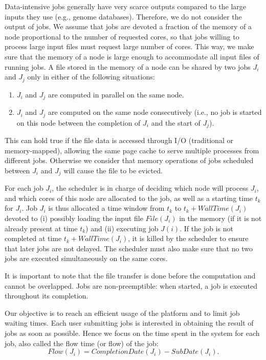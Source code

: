 \documentclass[conference]{IEEEtran}
\newcommand{\file}{\ensuremath{\mathit{File}}\xspace}
\newcommand{\memory}{\ensuremath{\mathit{M}}\xspace}
\newcommand{\submissiontime}{\mathit{SubDate}\xspace}
\newcommand{\walltime}{\mathit{WallTime}\xspace}
\newcommand{\completiontime}{\mathit{CompletionDate}\xspace}
\begin{document}
Data-intensive jobs generally have very scarce outputs compared to the large inputs they use (e.g., genome databases). 
Therefore, we do not consider the output of jobs.
We assume that jobs are
devoted a fraction of the memory of a node proportional to the number of
requested cores, so that jobs willing to process large input files
must request large number of cores. This way, we make sure that the
memory of a node is large enough to accommodate all input files of running jobs.
A file stored in the memory of a node can be shared by two jobs $J_i$
and $J_j$ only in either of the following situations:
\begin{enumerate}
	\item $J_i$ and $J_j$ are computed in parallel on the same node.
	\item $J_i$ and $J_j$ are computed on the same node
          consecutively (i.e., no job is started on this node between the
          completion of $J_i$ and the start of $J_j$).
\end{enumerate}
This can hold true if the file data is accessed through I/O (traditional or memory-mapped),
allowing the same page cache to serve multiple processes from different jobs.
Otherwise we consider that memory operations of jobs scheduled between
$J_i$ and $J_j$ will cause the file to be evicted.


For each job $J_i$, the scheduler is in charge of deciding which node
will process $J_i$, and which cores of this node
are allocated to the job, as well as a starting time $t_k$ for $J_i$. Job
$J_i$ is thus allocated a time window from $t_k$ to
$t_k+\walltime(J_i)$ devoted to (i) possibly loading the input file
$\file(J_i)$ in the memory (if it is not already present at time
$t_k$) and (ii) executing job $J(i)$. If the job is not completed at
time $t_k+\walltime(J_i)$, it is killed by the scheduler to ensure
that later jobs are not delayed.  The scheduler must also make sure
that no two jobs are executed simultaneously on the same cores.

It is important to note that the file transfer is done before the computation and cannot be overlapped.
Jobs are non-preemptible: when started, a job is executed throughout its completion.

Our objective is to reach an efficient usage of the platform and to
limit job waiting times. Each
user submitting jobs is interested in obtaining the result of jobs
as soon as possible. Hence we focus on the time spent in the system
for each job, also called the flow time (or flow) of the job:
$$
\mathit{Flow}(J_i) = \completiontime(J_i) - \submissiontime(J_i).
$$
\end{document}
